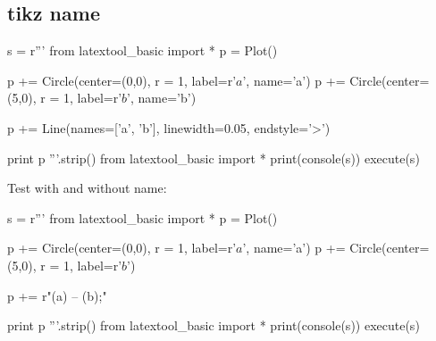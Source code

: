 \newpage
\subsection{tikz name}
\begin{python}
s = r'''
from latextool_basic import *
p = Plot()

p += Circle(center=(0,0), r = 1, label=r'$a$', name='a')
p += Circle(center=(5,0), r = 1, label=r'$b$', name='b')

p += Line(names=['a', 'b'], linewidth=0.05, endstyle='>')

print p
'''.strip()
from latextool_basic import *
print(console(s))
execute(s)
\end{python}


\newpage
Test with and without name:
\begin{python}
s = r'''
from latextool_basic import *
p = Plot()

p += Circle(center=(0,0), r = 1, label=r'$a$', name='a')
p += Circle(center=(5,0), r = 1, label=r'$b$')

p += r"\draw[->,line width=2] (a) -- (b);"

print p
'''.strip()
from latextool_basic import *
print(console(s))
execute(s)
\end{python}

